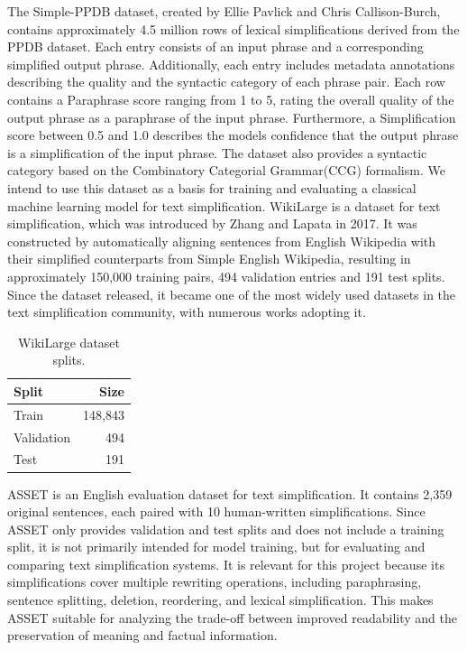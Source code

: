 \documentclass[sigconf, review, nonacm]{acmart}
\begin{document}
The Simple-PPDB dataset, created by Ellie Pavlick and Chris Callison-Burch\cite{pavlick2016simple}, contains approximately 4.5 million rows of lexical simplifications derived from the PPDB dataset. Each entry consists of an input phrase and a corresponding simplified output phrase. Additionally, each entry includes metadata annotations describing the quality and the syntactic category of each phrase pair. Each row contains a Paraphrase score ranging from 1 to 5, rating the overall quality of the output phrase as a paraphrase of the input phrase. Furthermore, a Simplification score between 0.5 and 1.0 describes the models confidence that the output phrase is a simplification of the input phrase. The dataset also provides a syntactic category based on the Combinatory Categorial Grammar(CCG) formalism. We intend to use this dataset as a basis for training and evaluating a classical machine learning model for text simplification.
\newline WikiLarge is a dataset for text simplification, which was introduced by Zhang and Lapata in 2017. It was constructed by automatically aligning sentences from English Wikipedia with their simplified counterparts from Simple English Wikipedia, resulting in approximately 150,000 training pairs, 494 validation entries and 191 test splits. Since the dataset released, it became one of the most widely used datasets in the text simplification community, with numerous works adopting it.
\begin{table}[h]
\centering
\begin{tabular}{lr}
\hline
\textbf{Split} & \textbf{Size} \\
\hline
Train      & 148,843 \\
Validation & 494     \\
Test       & 191     \\
\hline
\end{tabular}
\caption{WikiLarge dataset splits.}
\label{tab:wikilarge}
\end{table}
\newline ASSET is an English evaluation dataset for text simplification. It contains 2,359 original sentences, each paired with 10 human-written simplifications. Since ASSET only provides validation and test splits and does not include a training split, it is not primarily intended for model training, but for evaluating and comparing text simplification systems. It is relevant for this project because its simplifications cover multiple rewriting operations, including paraphrasing, sentence splitting, deletion, reordering, and lexical simplification. This makes ASSET suitable for analyzing the trade-off between improved readability and the preservation of meaning and factual information.
\end{document}
